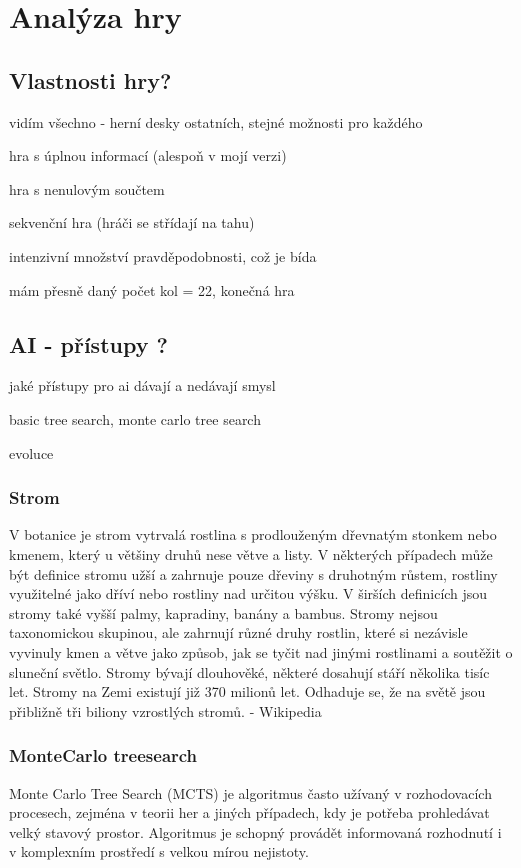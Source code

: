 \chapter{Analýza hry}

\section{Vlastnosti hry?}
vidím všechno - herní desky ostatních, stejné možnosti pro každého

hra s úplnou informací (alespoň v mojí verzi)

hra s nenulovým součtem

sekvenční hra (hráči se střídají na tahu)

intenzivní množství pravděpodobnosti, což je bída

mám přesně daný počet kol = 22, konečná hra


\section{AI - přístupy ?}
jaké přístupy pro ai dávají a nedávají smysl

basic tree search, monte carlo tree search

evoluce
\subsection{Strom}

V botanice je strom vytrvalá rostlina s prodlouženým dřevnatým stonkem nebo kmenem, který u většiny druhů nese větve a listy. V některých případech může být definice stromu užší a zahrnuje pouze dřeviny s druhotným růstem, rostliny využitelné jako dříví nebo rostliny nad určitou výšku. V širších definicích jsou stromy také vyšší palmy, kapradiny, banány a bambus. Stromy nejsou taxonomickou skupinou, ale zahrnují různé druhy rostlin, které si nezávisle vyvinuly kmen a větve jako způsob, jak se tyčit nad jinými rostlinami a soutěžit o sluneční světlo. Stromy bývají dlouhověké, některé dosahují stáří několika tisíc let. Stromy na Zemi existují již 370 milionů let. Odhaduje se, že na světě jsou přibližně tři biliony vzrostlých stromů. - Wikipedia

\subsection{MonteCarlo treesearch}

Monte Carlo Tree Search (MCTS) je algoritmus často užívaný v rozhodovacích procesech, zejména v teorii her a jiných případech, kdy je potřeba prohledávat velký stavový prostor. Algoritmus je schopný provádět informovaná rozhodnutí i v komplexním prostředí s velkou mírou nejistoty.

